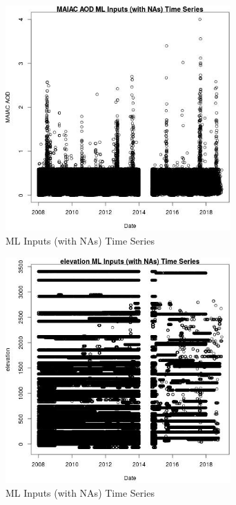 \begin{figure} 
\centering  
\includegraphics[width=0.77\textwidth]{Code_Outputs/Report_ML_input_PM25_Step4_part_e_de_duplicated_aveswNAs_MAIAC_AODvDate.jpg} 
\caption{\label{fig:Report_ML_input_PM25_Step4_part_e_de_duplicated_aveswNAsMAIAC_AODvDate}ML Inputs (with NAs) Time Series} 
\end{figure} 
 

\begin{figure} 
\centering  
\includegraphics[width=0.77\textwidth]{Code_Outputs/Report_ML_input_PM25_Step4_part_e_de_duplicated_aveswNAs_elevationvDate.jpg} 
\caption{\label{fig:Report_ML_input_PM25_Step4_part_e_de_duplicated_aveswNAselevationvDate}ML Inputs (with NAs) Time Series} 
\end{figure} 
 

